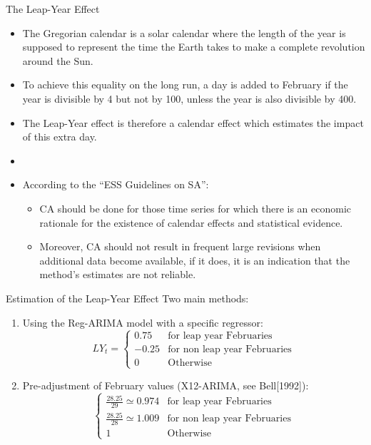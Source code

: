 \documentclass[10pt]{beamer}
\begin{document}
\begin{frame}{The Leap-Year Effect}
 \begin{itemize}
  \item The Gregorian calendar is a solar calendar where the length of the year is supposed to represent the time the Earth takes to make a complete revolution around the Sun. 
	\item To achieve this equality on the long run, a day is added to February if the year is divisible by 4 but not by 100, unless the year is also divisible by 400.
  \item The Leap-Year effect is therefore a calendar effect which estimates the impact of this extra day.
	\item[]
	\item<2-> According to the ``ESS Guidelines on SA'':
    \begin{itemize}
	     \item<2-> CA should be done for those time series for which there is an economic rationale for the existence of calendar effects and statistical evidence. 
	     \item<2-> Moreover, CA should not result in frequent large revisions when additional data become available, if it does, it is an indication that the method's estimates are not reliable.
    \end{itemize}
 \end{itemize}
\end{frame}

\begin{frame}{Estimation of the Leap-Year Effect}
Two main methods:
\begin{enumerate}
\item<1-> Using the Reg-ARIMA model with a specific regressor:
\[
LY_t = \begin{cases}
0.75 & \text{for leap year Februaries} \\
-0.25  & \text{for non leap year Februaries} \\
0 & \text{Otherwise}
\end{cases}
\]
\item<2-> Pre-adjustment of February values (X12-ARIMA, see Bell[1992]): 
\[\begin{cases}
\frac{28.25}{29} \simeq 0.974 & \text{for leap year Februaries} \\
\frac{28.25}{28} \simeq 1.009 & \text{for non leap year Februaries} \\
1 & \text{Otherwise}
\end{cases}
\]
\end{enumerate}
\end{frame}
\end{document}
